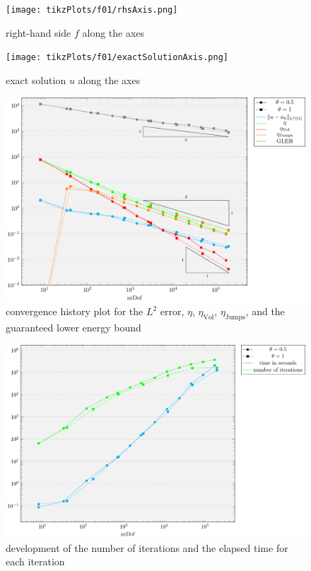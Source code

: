 \documentclass[draft=false,twoside,12pt]{scrreprt}
\begin{document}
\begin{minipage}[t]{0.45\textwidth}
  \begin{figure}[H]
	  \centering
		\texttt{[image: tikzPlots/f01/rhsAxis.png]} 
		\caption{right-hand side $f$ along the axes}
  \end{figure}
\end{minipage}
\begin{minipage}[t]{0.45\textwidth}
  \begin{figure}[H]
	  \centering
		\texttt{[image: tikzPlots/f01/exactSolutionAxis.png]} 
		\caption{exact solution $u$ along the axes}
  \end{figure}
\end{minipage}

\begin{figure}[H]
	\centering
	\includegraphics[width=14cm]{tikzPlots/f01/convergence.pdf}
  \caption{convergence history plot for the $L^2$ error, $\eta$,
  $\eta_\text{Vol}$, $\eta_\text{Jumps}$, and the guaranteed lower energy
  bound}
\end{figure}

\begin{figure}[H]
	\centering
	\includegraphics[width=14cm]{tikzPlots/f01/misc.pdf}
  \caption{development of the number of iterations and the elapsed time for 
  each iteration}
\end{figure}
\end{document}
